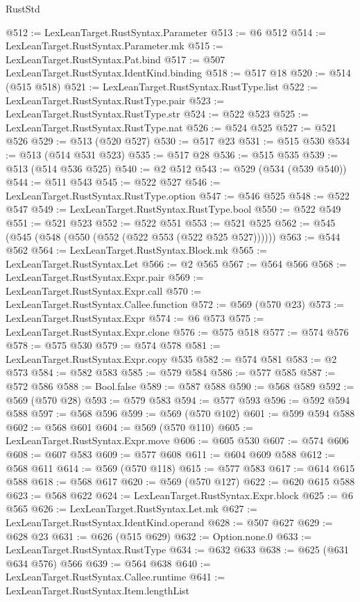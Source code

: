 \begin{lexlean}{RustStd}
\begin{coremodule}
@512 := LexLeanTarget.RustSyntax.Parameter
@513 := @6 @512
@514 := LexLeanTarget.RustSyntax.Parameter.mk
@515 := LexLeanTarget.RustSyntax.Pat.bind
@517 := @507 LexLeanTarget.RustSyntax.IdentKind.binding
@518 := @517 @18
@520 := @514 (@515 @518)
@521 := LexLeanTarget.RustSyntax.RustType.list
@522 := LexLeanTarget.RustSyntax.RustType.pair
@523 := LexLeanTarget.RustSyntax.RustType.str
@524 := @522 @523
@525 := LexLeanTarget.RustSyntax.RustType.nat
@526 := @524 @525
@527 := @521 @526
@529 := @513 (@520 @527)
@530 := @517 @23
@531 := @515 @530
@534 := @513 (@514 @531 @523)
@535 := @517 @28
@536 := @515 @535
@539 := @513 (@514 @536 @525)
@540 := @2 @512
@543 := @529 (@534 (@539 @540))
@544 := @511 @543
@545 := @522 @527
@546 := LexLeanTarget.RustSyntax.RustType.option
@547 := @546 @525
@548 := @522 @547
@549 := LexLeanTarget.RustSyntax.RustType.bool
@550 := @522 @549
@551 := @521 @523
@552 := @522 @551
@553 := @521 @525
@562 := @545 (@545 (@548 (@550 (@552 (@522 @553 (@522 @525 @527))))))
@563 := @544 @562
@564 := LexLeanTarget.RustSyntax.Block.mk
@565 := LexLeanTarget.RustSyntax.Let
@566 := @2 @565
@567 := @564 @566
@568 := LexLeanTarget.RustSyntax.Expr.pair
@569 := LexLeanTarget.RustSyntax.Expr.call
@570 := LexLeanTarget.RustSyntax.Callee.function
@572 := @569 (@570 @23)
@573 := LexLeanTarget.RustSyntax.Expr
@574 := @6 @573
@575 := LexLeanTarget.RustSyntax.Expr.clone
@576 := @575 @518
@577 := @574 @576
@578 := @575 @530
@579 := @574 @578
@581 := LexLeanTarget.RustSyntax.Expr.copy @535
@582 := @574 @581
@583 := @2 @573
@584 := @582 @583
@585 := @579 @584
@586 := @577 @585
@587 := @572 @586
@588 := Bool.false
@589 := @587 @588
@590 := @568 @589
@592 := @569 (@570 @28)
@593 := @579 @583
@594 := @577 @593
@596 := @592 @594 @588
@597 := @568 @596
@599 := @569 (@570 @102)
@601 := @599 @594 @588
@602 := @568 @601
@604 := @569 (@570 @110)
@605 := LexLeanTarget.RustSyntax.Expr.move
@606 := @605 @530
@607 := @574 @606
@608 := @607 @583
@609 := @577 @608
@611 := @604 @609 @588
@612 := @568 @611
@614 := @569 (@570 @118)
@615 := @577 @583
@617 := @614 @615 @588
@618 := @568 @617
@620 := @569 (@570 @127)
@622 := @620 @615 @588
@623 := @568 @622
@624 := LexLeanTarget.RustSyntax.Expr.block
@625 := @6 @565
@626 := LexLeanTarget.RustSyntax.Let.mk
@627 := LexLeanTarget.RustSyntax.IdentKind.operand
@628 := @507 @627
@629 := @628 @23
@631 := @626 (@515 @629)
@632 := Option.none.{0}
@633 := LexLeanTarget.RustSyntax.RustType
@634 := @632 @633
@638 := @625 (@631 @634 @576) @566
@639 := @564 @638
@640 := LexLeanTarget.RustSyntax.Callee.runtime
@641 := LexLeanTarget.RustSyntax.Item.lengthList

\end{coremodule}
\end{lexlean}
